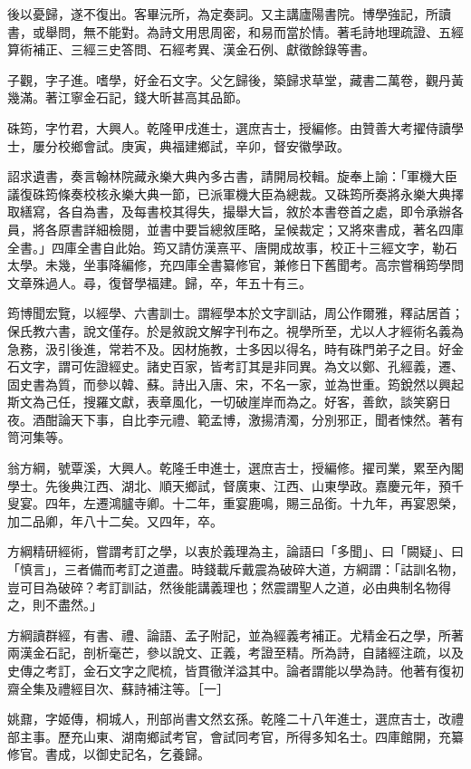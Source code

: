 \begin{pinyinscope}
後以憂歸，遂不復出。客畢沅所，為定奏詞。又主講廬陽書院。博學強記，所讀書，或舉問，無不能對。為詩文用思周密，和易而當於情。著毛詩地理疏證、五經算術補正、三經三史答問、石經考異、漢金石例、獻徵餘錄等書。

子觀，字子進。嗜學，好金石文字。父乞歸後，築歸求草堂，藏書二萬卷，觀丹黃幾滿。著江寧金石記，錢大昕甚高其品節。

硃筠，字竹君，大興人。乾隆甲戌進士，選庶吉士，授編修。由贊善大考擢侍讀學士，屢分校鄉會試。庚寅，典福建鄉試，辛卯，督安徽學政。

詔求遺書，奏言翰林院藏永樂大典內多古書，請開局校輯。旋奉上諭：「軍機大臣議復硃筠條奏校核永樂大典一節，已派軍機大臣為總裁。又硃筠所奏將永樂大典擇取繕寫，各自為書，及每書校其得失，撮舉大旨，敘於本書卷首之處，即令承辦各員，將各原書詳細檢閱，並書中要旨總敘厓略，呈候裁定；又將來書成，著名四庫全書。」四庫全書自此始。筠又請仿漢熹平、唐開成故事，校正十三經文字，勒石太學。未幾，坐事降編修，充四庫全書纂修官，兼修日下舊聞考。高宗嘗稱筠學問文章殊過人。尋，復督學福建。歸，卒，年五十有三。

筠博聞宏覽，以經學、六書訓士。謂經學本於文字訓詁，周公作爾雅，釋詁居首；保氏教六書，說文僅存。於是敘說文解字刊布之。視學所至，尤以人才經術名義為急務，汲引後進，常若不及。因材施教，士多因以得名，時有硃門弟子之目。好金石文字，謂可佐證經史。諸史百家，皆考訂其是非同異。為文以鄭、孔經義，遷、固史書為質，而參以韓、蘇。詩出入唐、宋，不名一家，並為世重。筠銳然以興起斯文為己任，搜羅文獻，表章風化，一切破崖岸而為之。好客，善飲，談笑窮日夜。酒酣論天下事，自比李元禮、範孟博，激揚清濁，分別邪正，聞者悚然。著有笥河集等。

翁方綱，號覃溪，大興人。乾隆壬申進士，選庶吉士，授編修。擢司業，累至內閣學士。先後典江西、湖北、順天鄉試，督廣東、江西、山東學政。嘉慶元年，預千叟宴。四年，左遷鴻臚寺卿。十二年，重宴鹿鳴，賜三品銜。十九年，再宴恩榮，加二品卿，年八十二矣。又四年，卒。

方綱精研經術，嘗謂考訂之學，以衷於義理為主，論語曰「多聞」、曰「闕疑」、曰「慎言」，三者備而考訂之道盡。時錢載斥戴震為破碎大道，方綱謂：「詁訓名物，豈可目為破碎？考訂訓詁，然後能講義理也；然震謂聖人之道，必由典制名物得之，則不盡然。」

方綱讀群經，有書、禮、論語、孟子附記，並為經義考補正。尤精金石之學，所著兩漢金石記，剖析毫芒，參以說文、正義，考證至精。所為詩，自諸經注疏，以及史傳之考訂，金石文字之爬梳，皆貫徹洋溢其中。論者謂能以學為詩。他著有復初齋全集及禮經目次、蘇詩補注等。［一］

姚鼐，字姬傳，桐城人，刑部尚書文然玄孫。乾隆二十八年進士，選庶吉士，改禮部主事。歷充山東、湖南鄉試考官，會試同考官，所得多知名士。四庫館開，充纂修官。書成，以御史記名，乞養歸。


\end{pinyinscope}
